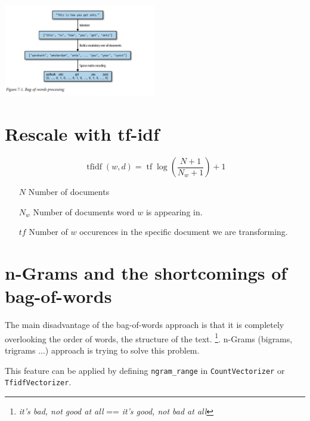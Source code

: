 \documentclass[nobib]{tufte-handout}
\begin{document}
\begin{marginfigure}
\includegraphics[width=250]{bagofwords_processing.png}
\label{}
\end{marginfigure}



\section{Rescale with tf-idf}%
\label{sec:rescale_with_tf_idf}


\begin{equation}
\operatorname{tfidf}(w, d)=\operatorname{tf} \log \left(\frac{N+1}{N_{w}+1}\right)+1
\end{equation}

\begin{itemize}
    \item [$N$] Number of documents

    \item [$N_{w}$] Number of documents word \(w\) is appearing in.

    \item [$tf$] Number of \(w\) occurences in the specific document we are transforming.
\end{itemize}


\section{n-Grams and the shortcomings of bag-of-words}%
\label{sec:n_grams_and_the_shortcomings_of_bag_of_words}

The main disadvantage of the bag-of-words approach is that it is completely overlooking the order of words, the structure of the text. \footnote{ \textit{it's bad, not good at all} == \textit{it's good, not bad at all}  }. n-Grams (bigrams, trigrams ...) approach is trying to solve this problem.

This feature can be applied by defining \verb|ngram_range| in \verb|CountVectorizer| or \verb|TfidfVectorizer|.
\printbibliography
\end{document}
